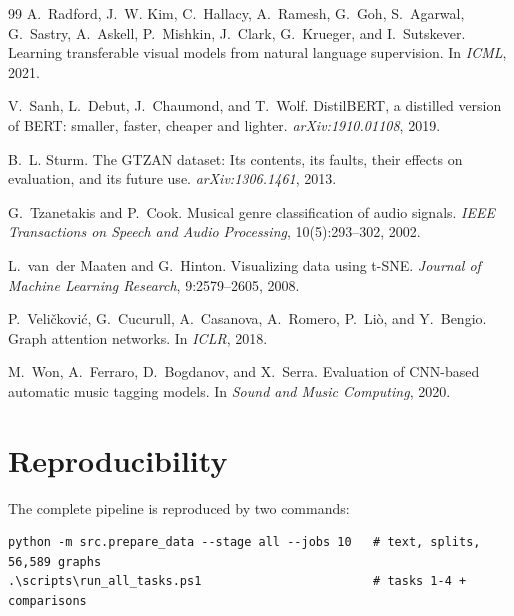 \documentclass{article}
\begin{document}
\begin{thebibliography}{99}
A.~Radford, J.~W. Kim, C.~Hallacy, A.~Ramesh, G.~Goh, S.~Agarwal, G.~Sastry,
A.~Askell, P.~Mishkin, J.~Clark, G.~Krueger, and I.~Sutskever.
\newblock Learning transferable visual models from natural language supervision.
\newblock In \emph{ICML}, 2021.

V.~Sanh, L.~Debut, J.~Chaumond, and T.~Wolf.
\newblock DistilBERT, a distilled version of BERT: smaller, faster, cheaper and
lighter.
\newblock \emph{arXiv:1910.01108}, 2019.

B.~L. Sturm.
\newblock The GTZAN dataset: Its contents, its faults, their effects on
evaluation, and its future use.
\newblock \emph{arXiv:1306.1461}, 2013.

G.~Tzanetakis and P.~Cook.
\newblock Musical genre classification of audio signals.
\newblock \emph{IEEE Transactions on Speech and Audio Processing},
10(5):293--302, 2002.

L.~van~der Maaten and G.~Hinton.
\newblock Visualizing data using t-SNE.
\newblock \emph{Journal of Machine Learning Research}, 9:2579--2605, 2008.

P.~Veli\v{c}kovi\'{c}, G.~Cucurull, A.~Casanova, A.~Romero, P.~Li\`{o}, and
Y.~Bengio.
\newblock Graph attention networks.
\newblock In \emph{ICLR}, 2018.

M.~Won, A.~Ferraro, D.~Bogdanov, and X.~Serra.
\newblock Evaluation of CNN-based automatic music tagging models.
\newblock In \emph{Sound and Music Computing}, 2020.

\end{thebibliography}

\appendix

\section{Reproducibility}

The complete pipeline is reproduced by two commands:
\begin{verbatim}
python -m src.prepare_data --stage all --jobs 10   # text, splits, 56,589 graphs
.\scripts\run_all_tasks.ps1                        # tasks 1-4 + comparisons
\end{verbatim}
\end{document}

